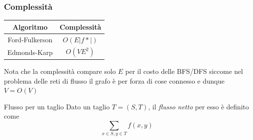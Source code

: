 \subsubsection{Complessità}
\begin{center}
	\begin{tabular}{cc}
		\toprule
		Algoritmo      & Complessità                         \\
		\midrule
		Ford-Fulkerson & $ O\left(E \left|f*\right|\right) $ \\
		Edmonds-Karp   & $ O\left(V E^2 \right) $            \\
		\bottomrule
	\end{tabular}
\end{center}
Nota che la complessità compare solo $ E $ per il costo delle BFS/DFS siccome nel problema delle reti di flusso il grafo è per forza di cose connesso e dunque $ V = O \left(V\right) $

\begin{definizione}{Flusso per un taglio}
	Dato un taglio $ T = \left(S, T\right) $, il \textit{flusso netto} per esso è definito come
	\[
		\sum_{x \in S,  y \in T}f\left(x,y\right)
	\]

\end{definizione}
